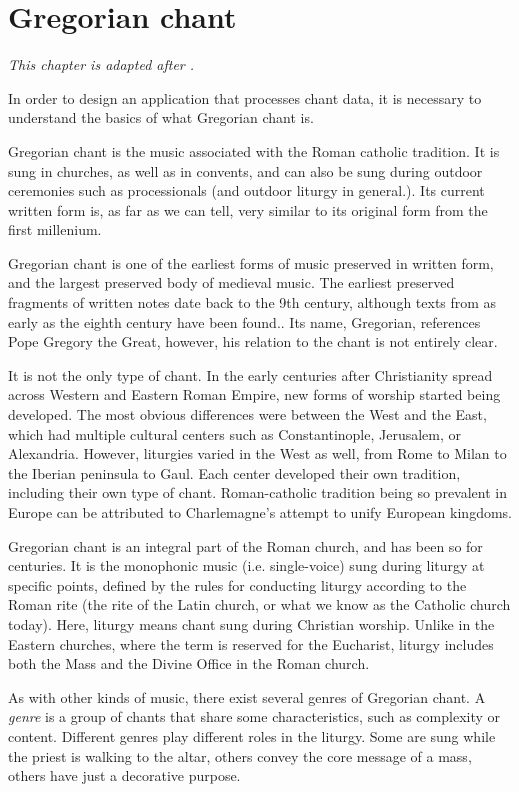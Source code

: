 \chapter{Gregorian chant}

\emph{This chapter is adapted after \cite{chant_book}.}

In order to design an application that processes chant data, it is necessary to understand the basics of what Gregorian chant is.

Gregorian chant is the music associated with the Roman catholic tradition. It is sung in churches, as well as in convents, and can also be sung during outdoor
ceremonies such as processionals (and outdoor liturgy in general.). Its current written form is, as far as we can tell, very similar to its original
form from the first millenium.

Gregorian chant is one of the earliest forms of music preserved in written form, and the
largest preserved body of medieval music. The earliest preserved fragments of written notes date back to the 9th century, although texts from as early as 
the eighth century have been found.. Its name, Gregorian, references Pope Gregory the Great, however, his relation to the chant is not entirely clear.

It is not the only type of chant. In the early centuries after Christianity spread across Western and Eastern Roman Empire,
new forms of worship started being developed. The most obvious differences were between the West and the East, which had multiple cultural
centers such as Constantinople, Jerusalem, or Alexandria. However, liturgies varied in the West as well, from Rome to Milan to the Iberian peninsula to Gaul.
Each center developed their own tradition, including their own type of chant. Roman-catholic tradition being so prevalent in Europe
can be attributed to Charlemagne's attempt to unify European kingdoms.

Gregorian chant is an integral part of the Roman church, and has been so for centuries. It is the monophonic music (i.e. single-voice)
sung during liturgy at specific points, defined by the rules for conducting liturgy according to the Roman rite (the rite of the Latin church, or what
we know as the Catholic church today). Here, liturgy means chant sung during Christian worship. Unlike in the Eastern churches, where the term is reserved 
for the Eucharist, liturgy includes both the Mass and the Divine Office in the Roman church.

As with other kinds of music, there exist several genres of Gregorian chant. A \emph{genre} is a group of chants that share some characteristics, such as
complexity or content. Different genres play different roles in the liturgy. Some are sung while the priest is walking to the altar, others convey the
core message of a mass, others have just a decorative purpose.

